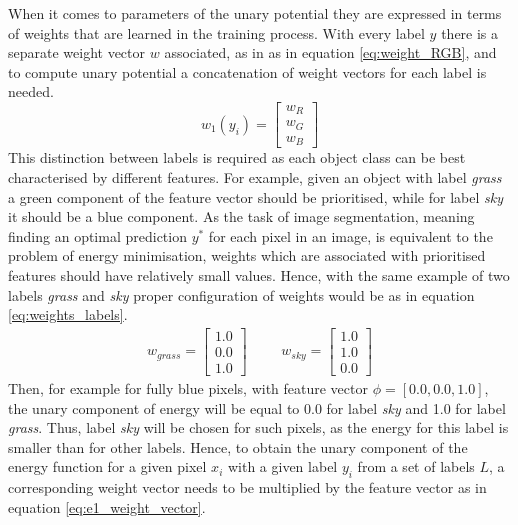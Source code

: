 When it comes to parameters of the unary potential they are expressed in terms of weights that are learned in the training process. With every label $y$ there is a separate weight vector $w$ associated, as in as in equation \ref{eq:weight_RGB}, and to compute unary potential a concatenation of weight vectors for each label is needed.
\begin{equation}
    \label{eq:weight_RGB}
     w_1(y_i) = \begin{bmatrix}
        w_R\\ 
        w_G\\ 
        w_B
    \end{bmatrix}
\end{equation}
This distinction between labels is required as each object class can be best characterised by different features. For example, given an object with label \textit{grass} a green component of the feature vector should be prioritised, while for label \textit{sky} it should be a blue component. As the task of image segmentation, meaning finding an optimal prediction $y^*$ for each pixel in an image, is equivalent to the problem of energy minimisation, weights which are associated with prioritised features should have relatively small values. Hence, with the same example of two labels \textit{grass} and \textit{sky} proper configuration of weights would be as in equation \ref{eq:weights_labels}.
\begin{equation}
    \label{eq:weights_labels}
    \begin{matrix} 
        w_{grass} = \begin{bmatrix}
            1.0\\ 
            0.0\\ 
            1.0
            \end{bmatrix}  
        & & &
        w_{sky} = \begin{bmatrix}
            1.0\\ 
            1.0\\ 
            0.0
            \end{bmatrix} 
    \end{matrix}
\end{equation}
Then, for example for fully blue pixels, with feature vector $\phi = [0.0, 0.0, 1.0]$, the unary component of energy will be equal to 0.0 for label \textit{sky} and 1.0 for label \textit{grass}. Thus, label \textit{sky} will be chosen for such pixels, as the energy for this label is smaller than for other labels. 
Hence, to obtain the unary component of the energy function for a given pixel $x_i$ with a given label $y_i$ from a set of labels $L$, a corresponding weight vector needs to be multiplied by the feature vector as in equation \ref{eq:e1_weight_vector}. 
